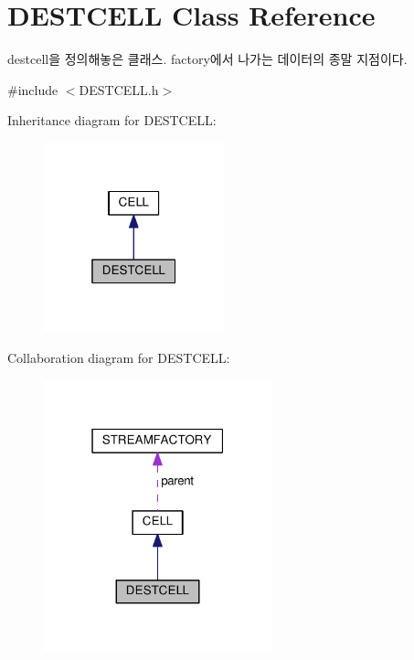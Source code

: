 \hypertarget{classDESTCELL}{}\section{D\+E\+S\+T\+C\+E\+L\+L Class Reference}
\label{classDESTCELL}


destcell을 정의해놓은 클래스. factory에서 나가는 데이터의 종말 지점이다.  




{\ttfamily \#include $<$D\+E\+S\+T\+C\+E\+L\+L.\+h$>$}



Inheritance diagram for D\+E\+S\+T\+C\+E\+L\+L\+:\nopagebreak
\begin{figure}[H]
\begin{center}
\leavevmode
\includegraphics[width=148pt]{classDESTCELL__inherit__graph}
\end{center}
\end{figure}


Collaboration diagram for D\+E\+S\+T\+C\+E\+L\+L\+:\nopagebreak
\begin{figure}[H]
\begin{center}
\leavevmode
\includegraphics[width=187pt]{classDESTCELL__coll__graph}
\end{center}
\end{figure}
